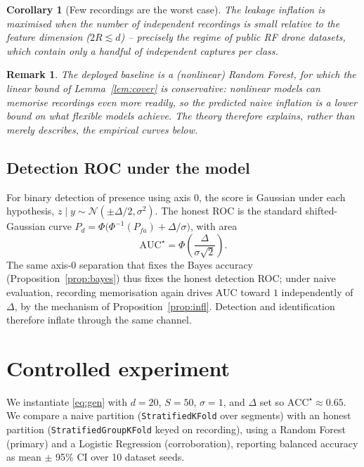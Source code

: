 \documentclass[11pt]{article}
\newtheorem{corollary}{Corollary}
\newtheorem{remark}{Remark}
\begin{document}
\begin{corollary}[Few recordings are the worst case]
\label{cor:few}
The leakage inflation is maximised when the number of independent recordings is small relative to the feature dimension ($2R\lesssim d$) -- precisely the regime of public RF drone datasets, which contain only a handful of independent captures per class.
\end{corollary}

\begin{remark}
The deployed baseline is a (nonlinear) Random Forest, for which the linear bound of Lemma~\ref{lem:cover} is conservative: nonlinear models can memorise recordings even more readily, so the predicted naive inflation is a lower bound on what flexible models achieve. The theory therefore explains, rather than merely describes, the empirical curves below.
\end{remark}

\subsection{Detection ROC under the model}
For binary detection of presence using axis $0$, the score is Gaussian under each hypothesis, $z\mid y \sim \mathcal{N}(\pm\Delta/2,\sigma^2)$. The honest ROC is the standard shifted-Gaussian curve $P_d=\Phi\!\big(\Phi^{-1}(P_{fa})+\Delta/\sigma\big)$, with area
\begin{equation}
\mathrm{AUC}^\star=\Phi\!\left(\frac{\Delta}{\sigma\sqrt2}\right).
\end{equation}
The same axis-$0$ separation that fixes the Bayes accuracy (Proposition~\ref{prop:bayes}) thus fixes the honest detection ROC; under naive evaluation, recording memorisation again drives AUC toward $1$ independently of $\Delta$, by the mechanism of Proposition~\ref{prop:infl}. Detection and identification therefore inflate through the same channel.

\section{Controlled experiment}
\label{sec:controlled}
We instantiate \eqref{eq:gen} with $d=20$, $S=50$, $\sigma=1$, and $\Delta$ set so $\mathrm{ACC}^\star\approx0.65$. We compare a naive partition (\texttt{StratifiedKFold} over segments) with an honest partition (\texttt{StratifiedGroupKFold} keyed on recording), using a Random Forest (primary) and a Logistic Regression (corroboration), reporting balanced accuracy as mean $\pm$ 95\% CI over 10 dataset seeds.
\end{document}
